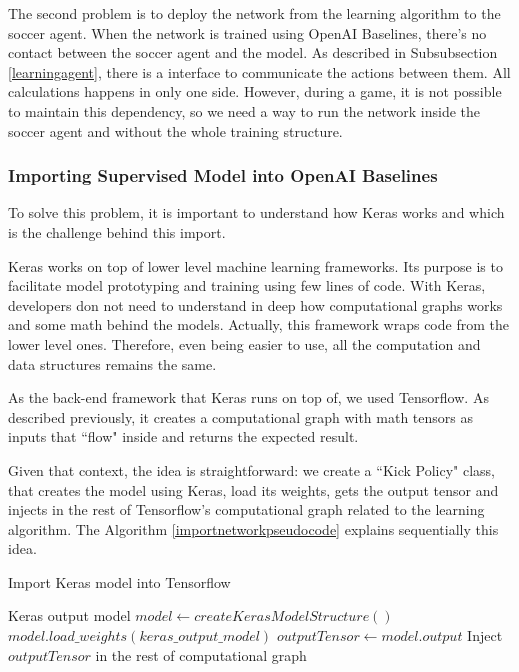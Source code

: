 The second problem is to deploy the network from the learning algorithm to the soccer agent. When the network is trained using OpenAI Baselines, there's no contact between the soccer agent and the model. As described in Subsubsection \ref{learningagent}, there is a interface to communicate the actions between them. All calculations happens in only one side. However, during a game, it is not possible to maintain this dependency, so we need a way to run the network inside the soccer agent and without the whole training structure.

\subsubsection{Importing Supervised Model into OpenAI Baselines}

To solve this problem, it is important to understand how Keras works and which is the challenge behind this import. 

Keras works on top of lower level machine learning frameworks. Its purpose is to facilitate model prototyping and training using few lines of code. With Keras, developers don not need to understand in deep how computational graphs works and some math behind the models. Actually, this framework wraps code from the lower level ones. Therefore, even being easier to use, all the computation and data structures remains the same.

As the back-end framework that Keras runs on top of, we used Tensorflow. As described previously, it creates a computational graph with math tensors as inputs that ``flow" inside and returns the expected result.

Given that context, the idea is straightforward: we create a     ``Kick Policy" class, that creates the model using Keras, load its weights, gets the output tensor and injects in the rest of Tensorflow's computational graph related to the learning algorithm. The Algorithm \ref{importnetworkpseudocode} explains sequentially this idea.

\begin{algorithm}
	\caption{Import Keras model into Tensorflow}
	\begin{algorithmic} 
		\REQUIRE Keras output model
		\STATE $model \leftarrow createKerasModelStructure()$
		\STATE $model.load\_weights(keras\_output\_model)$
		\STATE $outputTensor \leftarrow model.output$
		\STATE Inject $outputTensor$ in the rest of computational graph
	\end{algorithmic}
	\label{importnetworkpseudocode}
\end{algorithm}

